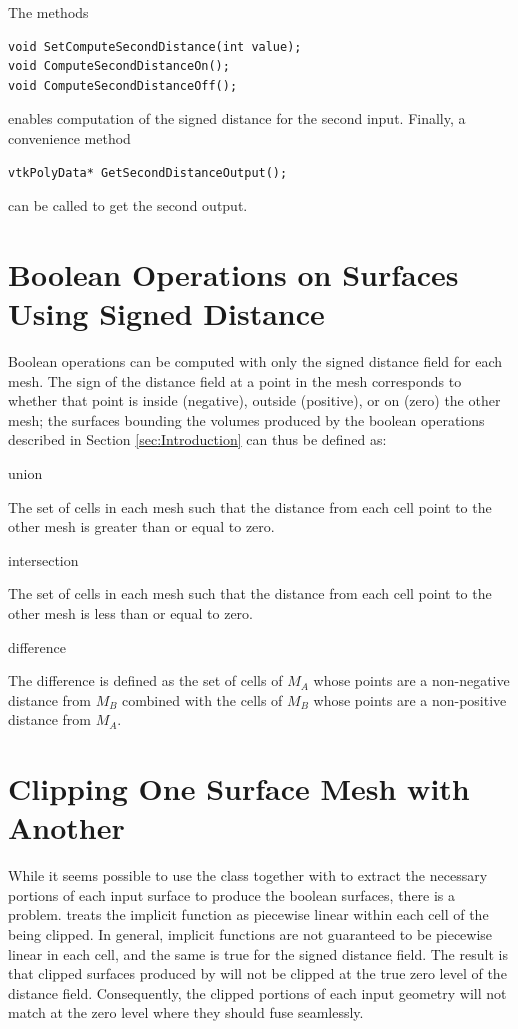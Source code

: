 \documentclass{InsightArticle}
\begin{document}
The methods
\begin{verbatim}
void SetComputeSecondDistance(int value);
void ComputeSecondDistanceOn();
void ComputeSecondDistanceOff();
\end{verbatim}
enables computation of the signed distance for the second input. Finally, a convenience method
\begin{verbatim}
vtkPolyData* GetSecondDistanceOutput();
\end{verbatim}
can be called to get the second output.

\section{Boolean Operations on Surfaces Using Signed Distance}

Boolean operations can be computed with only the signed distance field for each mesh. The sign of the distance field at a point in the mesh corresponds to whether that point is inside (negative), outside (positive), or on (zero) the other mesh; the surfaces bounding the volumes produced by the boolean operations described in Section \ref{sec:Introduction} can thus be defined as:

\begin{description}

\item union

The set of cells in each mesh such that the distance from each cell point to the other mesh is greater than or equal to zero.

\item intersection

The set of cells in each mesh such that the distance from each cell point to the other mesh is less than or equal to zero.

\item difference

The difference is defined as the set of cells of $M_A$ whose points are a non-negative distance from $M_B$ combined with the cells of $M_B$ whose points are a non-positive distance from $M_A$.

\end{description}

\section{Clipping One Surface Mesh with Another}

While it seems possible to use the class  together with  to extract the necessary portions of each input surface to produce the boolean surfaces, there is a problem.  treats the implicit function as piecewise linear within each cell of the  being clipped. In general, implicit functions are not guaranteed to be piecewise linear in each cell, and the same is true for the signed distance field. The result is that clipped surfaces produced by  will not be clipped at the true zero level of the distance field. Consequently, the clipped portions of each input geometry will not match at the zero level where they should fuse seamlessly.
\end{document}
